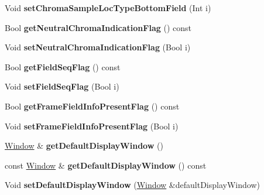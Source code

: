 \begin{DoxyCompactItemize}
\item 
\mbox{\label{class_t_com_v_u_i_a0241b873e894c15a0b9aa6742f25b55b}} 
Void {\bfseries set\+Chroma\+Sample\+Loc\+Type\+Bottom\+Field} (Int i)
\item 
\mbox{\label{class_t_com_v_u_i_a5025786e8e5093aa964e1a6937168263}} 
Bool {\bfseries get\+Neutral\+Chroma\+Indication\+Flag} () const
\item 
\mbox{\label{class_t_com_v_u_i_ac62c4a5015c15aeb451b01e7d37e4dbb}} 
Void {\bfseries set\+Neutral\+Chroma\+Indication\+Flag} (Bool i)
\item 
\mbox{\label{class_t_com_v_u_i_af60e4d0f25f97995e4fc61dd8e34f773}} 
Bool {\bfseries get\+Field\+Seq\+Flag} () const
\item 
\mbox{\label{class_t_com_v_u_i_a6389c0d48705146f0674b16cfe453e22}} 
Void {\bfseries set\+Field\+Seq\+Flag} (Bool i)
\item 
\mbox{\label{class_t_com_v_u_i_a3d8f99867fb027ea1668f136ea68721d}} 
Bool {\bfseries get\+Frame\+Field\+Info\+Present\+Flag} () const
\item 
\mbox{\label{class_t_com_v_u_i_a5eb653298e015ac24b73a53aece959c5}} 
Void {\bfseries set\+Frame\+Field\+Info\+Present\+Flag} (Bool i)
\item 
\mbox{\label{class_t_com_v_u_i_a9825a95217ce48683f97f0391ff3c557}} 
\hyperlink{class_window}{Window} \& {\bfseries get\+Default\+Display\+Window} ()
\item 
\mbox{\label{class_t_com_v_u_i_a01bf2f4df5c7700426d042b6d89d4b1e}} 
const \hyperlink{class_window}{Window} \& {\bfseries get\+Default\+Display\+Window} () const
\item 
\mbox{\label{class_t_com_v_u_i_a10ff4dbf4054d9254d2e5a4385851e4f}} 
Void {\bfseries set\+Default\+Display\+Window} (\hyperlink{class_window}{Window} \&default\+Display\+Window)
\item 
\mbox{\label{class_t_com_v_u_i_ab59a0ea0d8d55033146e7790d4a698de}} 

\end{DoxyCompactItemize}
